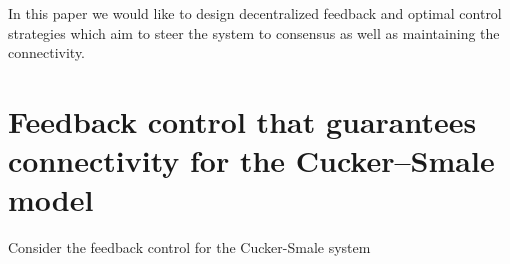 \documentclass[a4paper, english]{article}
\begin{document}
In this paper we would like to design decentralized feedback and optimal control strategies which aim to steer the system to consensus as well as maintaining the connectivity.

























\section{Feedback control that guarantees connectivity for the Cucker--Smale model}
Consider the feedback control for the Cucker-Smale system
\end{document}
